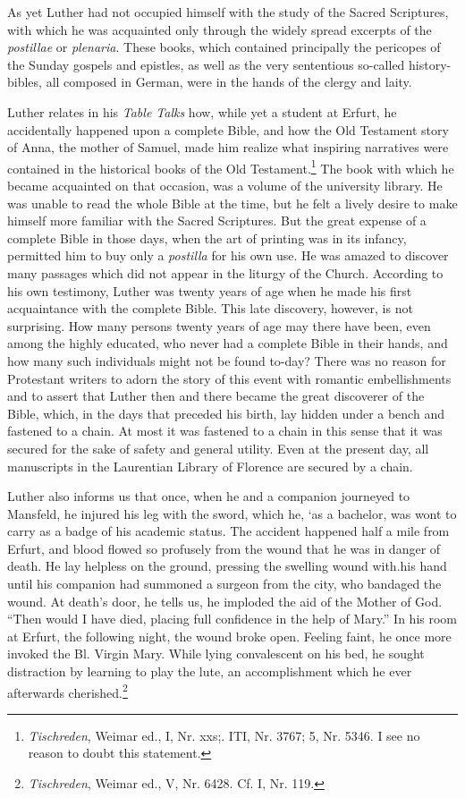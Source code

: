 As yet Luther had not occupied himself with the study of the
Sacred Scriptures, with which he was acquainted only through the
widely spread excerpts of the \textit{postillae} or \textit{plenaria}. These books, which
contained principally the pericopes of the Sunday gospels and epistles, as well as the very sententious so-called history-bibles, all composed in German, were in the hands of the clergy and laity.

Luther relates in his \textit{Table Talks} how, while yet a student at Erfurt,
he accidentally happened upon a complete Bible, and how the
Old Testament story of Anna, the mother of Samuel, made him
realize what inspiring narratives were contained in the historical
books of the Old Testament.\footnote{\textit{Tischreden}, Weimar ed., I, Nr. xxs;. ITI, Nr. 3767; 5, Nr. 5346. I see no reason to doubt this statement.}
The book with which he became acquainted on that occasion, was a volume of the university library.
He was unable to read the whole Bible at the time, but he felt a lively
desire to make himself more familiar with the Sacred Scriptures.
But the great expense of a complete Bible in those days, when the
art of printing was in its infancy, permitted him to buy only a
\textit{postilla} for his own use. He was amazed to discover many passages
which did not appear in the liturgy of the Church. According to
his own testimony, Luther was twenty years of age when he made
his first acquaintance with the complete Bible. This late discovery,
however, is not surprising. How many persons twenty years of age
may there have been, even among the highly educated, who never
had a complete Bible in their hands, and how many such individuals
might not be found to-day? There was no reason for Protestant
writers to adorn the story of this event with romantic embellishments
and to assert that Luther then and there became the great
discoverer of the Bible, which, in the days that preceded his birth,
lay hidden under a bench and fastened to a chain. At most it was
fastened to a chain in this sense that it was secured for the sake
of safety and general utility. Even at the present day, all manuscripts
in the Laurentian Library of Florence are secured by a chain.

Luther also informs us that once, when he and a companion
journeyed to Mansfeld, he injured his leg with the sword, which he,
‘as a bachelor, was wont to carry as a badge of his academic
status. The accident happened half a mile from Erfurt, and blood
flowed so profusely from the wound that he was in danger of death.
He lay helpless on the ground, pressing the swelling wound with.his
hand until his companion had summoned a surgeon from the city,
who bandaged the wound. At death’s door, he tells us, he imploded
the aid of the Mother of God. “Then would I have died, placing
full confidence in the help of Mary.” In his room at Erfurt, the following
night, the wound broke open. Feeling faint, he once more
invoked the Bl. Virgin Mary. While lying convalescent on his bed,
he sought distraction by learning to play the lute, an accomplishment which he ever afterwards cherished.\footnote{\textit{Tischreden}, Weimar ed., V, Nr. 6428. Cf. I, Nr. 119.}

